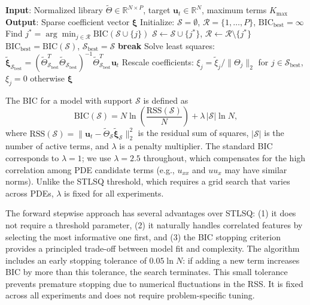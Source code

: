 \documentclass[preprint,12pt]{elsarticle}
\begin{document}
\begin{algorithm}[H]
\caption{Forward Stepwise BIC for Sparse PDE Discovery}
\label{alg:stepwise}
\begin{algorithmic}[1]
\STATE \textbf{Input}: Normalized library $\tilde{\Theta} \in \mathbb{R}^{N \times P}$, target $\mathbf{u}_t \in \mathbb{R}^N$, maximum terms $K_{\max}$
\STATE \textbf{Output}: Sparse coefficient vector $\boldsymbol{\xi}$
\STATE Initialize: $\mathcal{S} = \emptyset$, $\mathcal{R} = \{1, \ldots, P\}$, $\text{BIC}_{\text{best}} = \infty$
    \STATE Find $j^* = \arg\min_{j \in \mathcal{R}} \text{BIC}(\mathcal{S} \cup \{j\})$
    \STATE $\mathcal{S} \leftarrow \mathcal{S} \cup \{j^*\}$, $\mathcal{R} \leftarrow \mathcal{R} \setminus \{j^*\}$
        \STATE $\text{BIC}_{\text{best}} = \text{BIC}(\mathcal{S})$, $\mathcal{S}_{\text{best}} = \mathcal{S}$
        \STATE \textbf{break}
    \ENDIF
\ENDFOR
\STATE Solve least squares: $\tilde{\boldsymbol{\xi}}_{\mathcal{S}_{\text{best}}} = (\tilde{\Theta}_{\mathcal{S}_{\text{best}}}^T \tilde{\Theta}_{\mathcal{S}_{\text{best}}})^{-1} \tilde{\Theta}_{\mathcal{S}_{\text{best}}}^T \mathbf{u}_t$
\STATE Rescale coefficients: $\xi_j = \tilde{\xi}_j / \|\Theta_j\|_2$ for $j \in \mathcal{S}_{\text{best}}$, $\xi_j = 0$ otherwise
\RETURN $\boldsymbol{\xi}$
\end{algorithmic}
\end{algorithm}

The BIC for a model with support $\mathcal{S}$ is defined as
\begin{equation}
\text{BIC}(\mathcal{S}) = N \ln\left(\frac{\text{RSS}(\mathcal{S})}{N}\right) + \lambda \, |\mathcal{S}| \ln N,
\end{equation}
where $\text{RSS}(\mathcal{S}) = \|\mathbf{u}_t - \tilde{\Theta}_{\mathcal{S}} \tilde{\boldsymbol{\xi}}_{\mathcal{S}}\|_2^2$ is the residual sum of squares, $|\mathcal{S}|$ is the number of active terms, and $\lambda$ is a penalty multiplier. The standard BIC corresponds to $\lambda = 1$; we use $\lambda = 2.5$ throughout, which compensates for the high correlation among PDE candidate terms (e.g., $u_{xx}$ and $u u_x$ may have similar norms). Unlike the STLSQ threshold, which requires a grid search that varies across PDEs, $\lambda$ is fixed for all experiments.

The forward stepwise approach has several advantages over STLSQ: (1) it does not require a threshold parameter, (2) it naturally handles correlated features by selecting the most informative one first, and (3) the BIC stopping criterion provides a principled trade-off between model fit and complexity. The algorithm includes an early stopping tolerance of $0.05\ln N$: if adding a new term increases BIC by more than this tolerance, the search terminates. This small tolerance prevents premature stopping due to numerical fluctuations in the RSS. It is fixed across all experiments and does not require problem-specific tuning.
\end{document}
